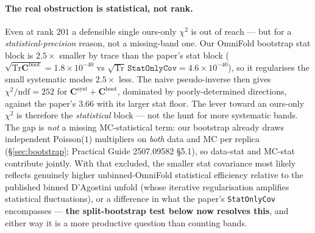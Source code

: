 \documentclass[12pt]{article}
\newcommand{\boot}{\text{boot}}
\newcommand{\syst}{\text{syst}}
\newcommand{\Tr}{\mathrm{Tr}}
\begin{document}
\paragraph{The real obstruction is statistical, not rank.}
Even at rank $201$ a defensible single ours-only $\chi^{2}$ is out of
reach --- but for a \emph{statistical-precision} reason, not a missing-band
one. Our OmniFold bootstrap stat block is $2.5\times$ smaller by trace than
the paper's stat block ($\sqrt{\Tr\mathbf{C}^{\boot}}=1.8\times10^{-40}$ vs
$\sqrt{\Tr}\,\texttt{StatOnlyCov}=4.6\times10^{-40}$), so it regularises the
small systematic modes $2.5\times$ less. The naive pseudo-inverse then gives
$\chi^{2}/\mathrm{ndf}=252$ for $\mathbf{C}^{\syst}+\mathbf{C}^{\boot}$,
dominated by poorly-determined directions, against the paper's $3.66$ with
its larger stat floor. The lever toward an ours-only $\chi^{2}$ is therefore
the \emph{statistical} block --- not the hunt for more systematic bands.
The gap is \emph{not} a missing MC-statistical term: our bootstrap already
draws independent Poisson($1$) multipliers on \emph{both} data and MC per
replica (\S\ref{sec:bootstrap}; Practical Guide 2507.09582 \S5.1), so
data-stat and MC-stat contribute jointly. With that excluded, the smaller
stat covariance most likely reflects genuinely higher unbinned-OmniFold
statistical efficiency relative to the published binned D'Agostini unfold
(whose iterative regularisation amplifies statistical fluctuations), or a
difference in what the paper's \texttt{StatOnlyCov} encompasses ---
\textbf{the split-bootstrap test below now resolves this}, and either way it is
a more productive question than counting bands.
\end{document}
